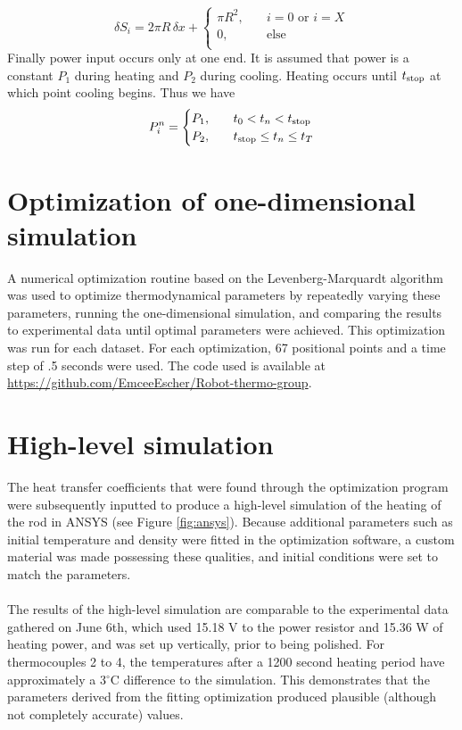 \documentclass[letterpaper,titlepage,oneside]{report}
\begin{document}
\begin{equation*}
  \delta S_i = 2\pi R\,\delta x +
  \begin{cases}
    \pi R^2, & \quad i=0 \text{ or } i=X\\
    0,       & \quad \text{else}\\
  \end{cases}
\end{equation*}
Finally power input occurs only at one end. It is assumed that
power is a constant $P_1$ during heating and $P_2$ during cooling.
Heating occurs until $t_{\rm{stop}}$ at which point cooling begins.
Thus we have
\begin{equation*}
  P_i^n =
  \begin{cases}
    P_1, & \quad t_0 < t_n < t_{\rm{stop}}\\
    P_2, & \quad t_{\rm{stop}} \leq t_n \leq t_T\\
  \end{cases}
\end{equation*}

\section{Optimization of one-dimensional simulation}
A numerical optimization routine based on the
Levenberg-Marquardt algorithm was used to optimize
thermodynamical parameters by repeatedly varying these parameters,
running the one-dimensional simulation, and comparing the results to
experimental data until optimal parameters were achieved.
This optimization was run for each dataset. For each optimization,
67 positional points and a time step of .5 seconds were used.
The code used is available at
\url{https://github.com/EmceeEscher/Robot-thermo-group}.

\section{High-level simulation}
The heat transfer coefficients that were found through the
optimization program were subsequently inputted to produce a high-level
simulation of the heating of the rod in ANSYS
(see Figure \ref{fig:ansys}). Because additional
parameters such as initial temperature and density were
fitted in the optimization software, a custom material was made
possessing these qualities, and initial conditions were set to
match the parameters.
\\\\
The results of the high-level simulation are comparable to the
experimental data gathered on June 6th, which used 15.18 V
to the power resistor and 15.36 W of heating power, and was set
up vertically, prior to being polished. For thermocouples 2 to
4, the temperatures after a 1200 second heating period have
approximately a 3$^{\circ}$C difference to the simulation.
This demonstrates that the parameters derived from the fitting
optimization produced plausible (although not completely
accurate) values.
\end{document}
